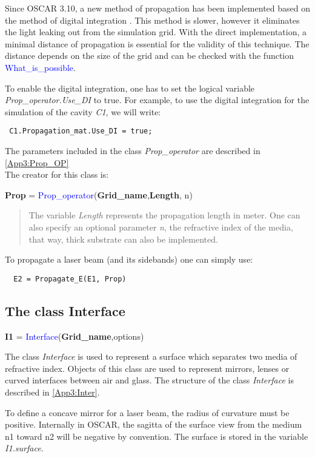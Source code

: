 Since OSCAR 3.10, a new method of propagation has been implemented based on the method of digital integration \cite{DI_paper}. This method is slower, however it eliminates the light leaking out from the simulation grid. With the direct implementation, a minimal distance of propagation is essential for the validity of this technique. The distance depends on the size of the grid and can be checked with the function \textcolor{blue}{What\_is\_possible}.

To enable the digital integration, one has to set the logical variable \textsl{Prop\_operator.Use\_DI} to true. For example, to use the digital integration for the simulation of the cavity \textsl{C1}, we will write:

\verb? C1.Propagation_mat.Use_DI = true; ?

The parameters included in the class \textsl{Prop\_operator} are described in \ref{App3:Prop_OP}\\


The creator for this class is:

\noindent \textbf{Prop} = \textcolor{blue}{Prop\_operator}(\textbf{Grid\_name},\textbf{Length}, n)

\vspace*{-0.2cm}
\begin{quote}
The variable \textsl{Length} represents the propagation length in meter. One can also specify an optional parameter \textsl{n}, the refractive index of the media, that way, thick substrate can also be implemented.
\end{quote}
To propagate a laser beam (and its sidebands) one can simply use:

\verb?  E2 = Propagate_E(E1, Prop) ?

\subsection{The class Interface}
\textbf{I1} = \textcolor{blue}{Interface}(\textbf{Grid\_name},options)

The class \textsl{Interface} is used to represent a surface which separates two media of refractive index. Objects of this class are used to represent mirrors, lenses or curved interfaces between air and glass. The structure of the class \textsl{Interface} is described in \ref{App3:Inter}.

To define a concave mirror for a laser beam, the radius of curvature must be positive. Internally in OSCAR, the sagitta of the surface view from the medium n1 toward n2 will be negative by convention. The surface is stored in the variable \textsl{I1.surface}.

